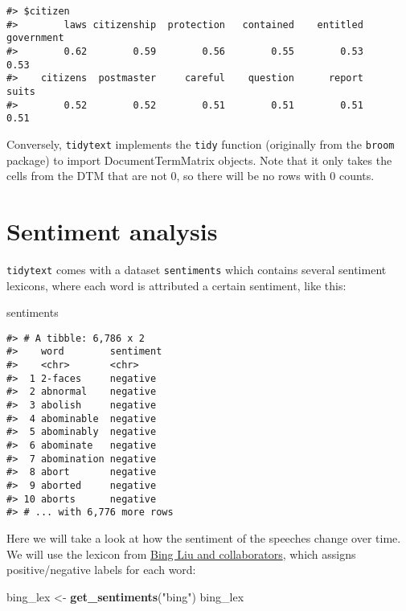 \documentclass[]{book}
\newenvironment{Shaded}{\begin{snugshade}}{\end{snugshade}}
\newcommand{\KeywordTok}[1]{\textcolor[rgb]{0.13,0.29,0.53}{\textbf{#1}}}
\newcommand{\NormalTok}[1]{#1}
\newcommand{\StringTok}[1]{\textcolor[rgb]{0.31,0.60,0.02}{#1}}
\begin{document}
\begin{verbatim}
#> $citizen
#>        laws citizenship  protection   contained    entitled  government 
#>        0.62        0.59        0.56        0.55        0.53        0.53 
#>    citizens  postmaster     careful    question      report       suits 
#>        0.52        0.52        0.51        0.51        0.51        0.51
\end{verbatim}

Conversely, \texttt{tidytext} implements the \texttt{tidy} function (originally from the \texttt{broom} package) to import DocumentTermMatrix objects. Note that it only takes the cells from the DTM that are not 0, so there will be no rows with 0 counts.

\hypertarget{sentiment-analysis}{%
\section{Sentiment analysis}\label{sentiment-analysis}}

\texttt{tidytext} comes with a dataset \texttt{sentiments} which contains several sentiment lexicons, where each word is attributed a certain sentiment, like this:

\begin{Shaded}
\begin{Highlighting}[]
\NormalTok{sentiments}
\end{Highlighting}
\end{Shaded}

\begin{verbatim}
#> # A tibble: 6,786 x 2
#>    word        sentiment
#>    <chr>       <chr>    
#>  1 2-faces     negative 
#>  2 abnormal    negative 
#>  3 abolish     negative 
#>  4 abominable  negative 
#>  5 abominably  negative 
#>  6 abominate   negative 
#>  7 abomination negative 
#>  8 abort       negative 
#>  9 aborted     negative 
#> 10 aborts      negative 
#> # ... with 6,776 more rows
\end{verbatim}

Here we will take a look at how the sentiment of the speeches change over time. We will use the lexicon from \href{https://www.cs.uic.edu/~liub/FBS/sentiment-analysis.html}{Bing Liu and collaborators}, which assigns positive/negative labels for each word:

\begin{Shaded}
\begin{Highlighting}[]
\NormalTok{bing_lex <-}\StringTok{ }\KeywordTok{get_sentiments}\NormalTok{(}\StringTok{"bing"}\NormalTok{)}
\NormalTok{bing_lex}
\end{Highlighting}
\end{Shaded}
\end{document}
